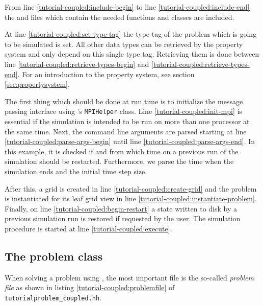 \begin{lst}\label{tutorial-coupled:mainfile} \mbox{}
  
\end{lst}

From line \ref{tutorial-coupled:include-begin} to line
\ref{tutorial-coupled:include-end} the \Dune and \Dumux files which
contain the needed functions and classes are included.

At line \ref{tutorial-coupled:set-type-tag} the type tag of the
problem which is going to be simulated is set. All other data types
can be retrieved by the \Dumux property system and only depend on this
single type tag. Retrieving them is done between line
\ref{tutorial-coupled:retrieve-types-begin} and
\ref{tutorial-coupled:retrieve-types-end}. For an introduction to the
property system, see section \ref{sec:propertysystem}.

The first thing which should be done at run time is to initialize the
message passing interface using \Dune's \texttt{MPIHelper} class. Line
\ref{tutorial-coupled:init-mpi} is essential if the simulation is
intended to be run on more than one processor at the same time. Next,
the command line arguments are parsed starting at line
\ref{tutorial-coupled:parse-args-begin} until line
\ref{tutorial-coupled:parse-args-end}. In this example, it is checked if and
from which time on a previous run of the simulation should be restarted. Furthermore, we
parse the time when the simulation ends and the initial time step size.

After this, a grid is created in line
\ref{tutorial-coupled:create-grid} and the problem is instantiated for
its leaf grid view in line \ref{tutorial-coupled:instantiate-problem}.
Finally, on line \ref{tutorial-coupled:begin-restart} a state written to
disk by a previous simulation run is restored if requested by the user.
The simulation procedure is started at line
\ref{tutorial-coupled:execute}.

\subsection{The problem class}

When solving a problem using \Dumux, the most important file is the
so-called \textit{problem file} as shown in listing
\ref{tutorial-coupled:problemfile} of
\texttt{tutorialproblem\_coupled.hh}.

